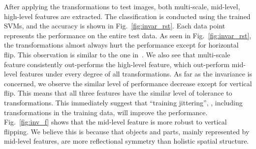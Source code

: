 \documentclass[10pt,twocolumn,letterpaper]{article}
\begin{document}
After applying the transformations to test images, both multi-scale, mid-level, high-level features are extracted. The classification is conducted using the trained SVMs, and the accuracy is shown in Fig.~\ref{fig:invar_rst}. Each data point represents the performance on the entire test data. As seen in Fig.~\ref{fig:invar_rst}, the transformations almost always hurt the performance except for horizontal flip. This observation is similar to the one in~\cite{Gong14}. We also see that multi-scale feature consistently out-performs the high-level feature, which out-perform mid-level features under every degree of all transformations. As far as the invariance is concerned, we observe the similar level of performance decrease except for vertical flip. This means that all three features have the similar level of tolerance to transformations. This immediately suggest that ``training jittering'', \ie, including transformations in the training data, will improve the performance. Fig.~\ref{fig:inv_f} shows that the mid-level feature is more robust to vertical flipping. We believe this is because that objects and parts, mainly represented by mid-level features, are more reflectional symmetry than holistic spatial structure. 
\end{document}

